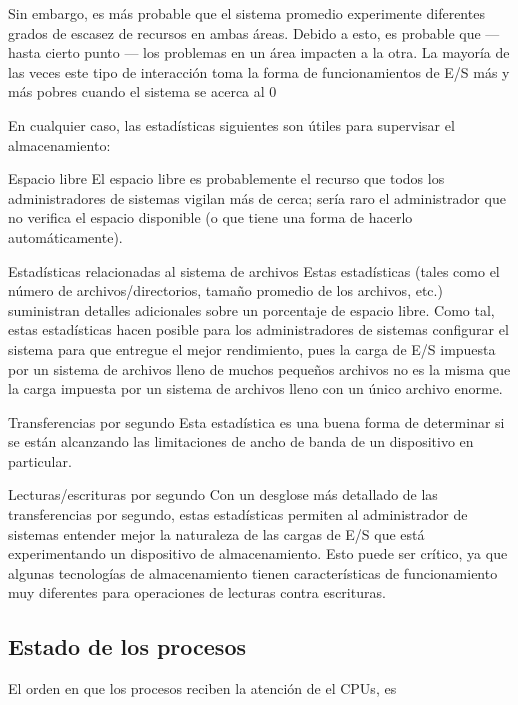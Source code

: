 \documentclass[12pt]{article}
\begin{document}
\begin{itemize}
Sin embargo, es más probable que el sistema promedio experimente diferentes grados de escasez de recursos en ambas áreas. Debido a esto, es probable que — hasta cierto punto — los problemas en un área impacten a la otra. La mayoría de las veces este tipo de interacción toma la forma de funcionamientos de E/S más y más pobres cuando el sistema se acerca al 0%

En cualquier caso, las estadísticas siguientes son útiles para supervisar el almacenamiento:

Espacio libre
El espacio libre es probablemente el recurso que todos los administradores de sistemas vigilan más de cerca; sería raro el administrador que no verifica el espacio disponible (o que tiene una forma de hacerlo automáticamente).

Estadísticas relacionadas al sistema de archivos
Estas estadísticas (tales como el número de archivos/directorios, tamaño promedio de los archivos, etc.) suministran detalles adicionales sobre un porcentaje de espacio libre. Como tal, estas estadísticas hacen posible para los administradores de sistemas configurar el sistema para que entregue el mejor rendimiento, pues la carga de E/S impuesta por un sistema de archivos lleno de muchos pequeños archivos no es la misma que la carga impuesta por un sistema de archivos lleno con un único archivo enorme.

Transferencias por segundo
Esta estadística es una buena forma de determinar si se están alcanzando las limitaciones de ancho de banda de un dispositivo en particular.

Lecturas/escrituras por segundo
Con un desglose más detallado de las transferencias por segundo, estas estadísticas permiten al administrador de sistemas entender mejor la naturaleza de las cargas de E/S que está experimentando un dispositivo de almacenamiento. Esto puede ser crítico, ya que algunas tecnologías de almacenamiento tienen características de funcionamiento muy diferentes para operaciones de lecturas contra escrituras.






\subsection*{Estado de los procesos}

El orden en que los procesos reciben la atención de el CPUs, es 


\end{itemize}
\end{document}
